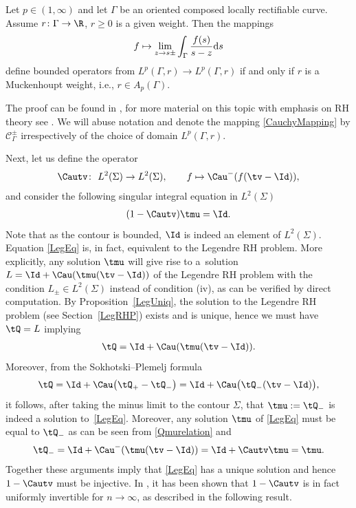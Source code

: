 \begin{Theorem}\label{Muckenhoupt}
Let $p\in(1, \infty)$ and let $\Gamma$ be an oriented composed locally rectifiable curve. Assume $r \colon \Gamma \to \R$, $r \geq 0$ is a given weight. Then the mappings
\begin{align}\label{CauchyMapping}
 f \mapsto \lim_{z\to s\pm} \int_\Gamma \frac{f(s)}{s-z} {\rm d}s
\end{align}
define bounded operators from $L^p(\Gamma, r) \to L^p(\Gamma, r)$ if and only if $r$ is a Muckenhoupt weight, i.e., $r\in A_p(\Gamma)$.
\end{Theorem}
The proof can be found in \cite[Theorem 4.15]{BK}, for more material on this topic with emphasis on RH theory see \cite{JL}. We will abuse notation and denote the mapping \eqref{CauchyMapping} by $\mathcal C^\pm_\Gamma$ irrespectively of the choice of domain $L^p(\Gamma, r)$.

Next, let us define the operator
\begin{align*}
 \Cautv \colon \ L^2(\Sigma) \to L^2(\Sigma), \qquad f \mapsto \Cau^-(f (\tv-\Id)),
\end{align*}
and consider the following singular integral equation in $L^2(\Sigma)$
\begin{align}\label{LegEq}
 (1-\Cautv)\tmu = \Id.
\end{align}
Note that as the contour is bounded, $\Id$ is indeed an element of $L^2(\Sigma)$. Equation \eqref{LegEq} is, in fact, equivalent to the Legendre RH problem. More explicitly, any solution $\tmu$ will give rise to a~solution $L = \Id + \Cau(\tmu(\tv -\Id))$ of the Legendre RH problem with the condition $L_\pm \in L^2(\Sigma)$ instead of condition (iv), as can be verified by direct computation. By Proposition~\ref{LegUniq}, the solution to the Legendre RH problem (see Section~\ref{LegRHP}) exists and is unique, hence we must have $\tQ = L$ implying
\begin{align}\label{Qmurelation}
 \tQ = \Id + \Cau(\tmu(\tv -\Id)).
\end{align}
Moreover, from the Sokhotski--Plemelj formula
\begin{align*}
 \tQ = \Id + \Cau\big(\tQ_+-\tQ_-\big) = \Id + \Cau\big(\tQ_-(\tv-\Id)\big),
\end{align*}
it follows, after taking the minus limit to the contour $\Sigma$, that $\tmu := \tQ_-$ is indeed a solution to~\eqref{LegEq}. Moreover, any solution $\tmu$ of \eqref{LegEq} must be equal to $\tQ_-$ as can be seen from \eqref{Qmurelation} and
\begin{align*}
 \tQ_- = \Id + \Cau^-(\tmu(\tv-\Id)) = \Id +\Cautv \tmu = \tmu.
\end{align*}
Together these arguments imply that \eqref{LegEq} has a unique solution and hence $1-\Cautv$ must be injective. In \cite{CD}, it has been shown that $1-\Cautv$ is in fact uniformly invertible for $n \to \infty$, as described in the following result.

